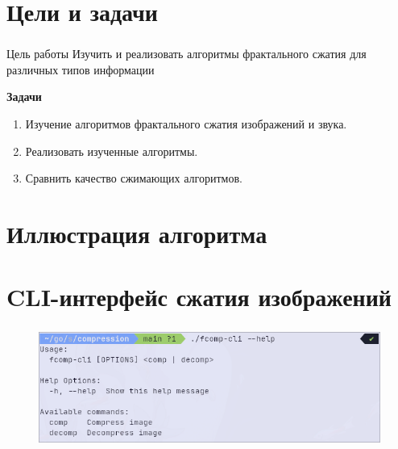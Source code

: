 \documentclass[t aspectratio=169]{beamer}
\begin{document}
  \section{Цели и задачи}
  \begin{frame}\frametitle{\insertsection}
    \large
    \begin{block}{Цель работы}
      Изучить и реализовать алгоритмы фрактального сжатия для различных типов информации
    \end{block}

    \vspace{1em}
    \textbf{Задачи}
    \begin{enumerate}
      \item Изучение алгоритмов фрактального сжатия изображений и звука.
      \item Реализовать изученные алгоритмы.
      \item Сравнить качество сжимающих алгоритмов.
    \end{enumerate}
    \normalfont
  \end{frame}

  \section{Иллюстрация алгоритма}
  \begin{frame}\frametitle{\insertsection}

  \end{frame}

  \section{CLI-интерфейс сжатия изображений}
  \begin{frame}\frametitle{\insertsection}
   \begin{figure}
    \begin{center}
      \includegraphics[width=\textwidth]{./images/cli-main.png}
    \end{center}
   \end{figure}
  \end{frame}
\end{document}
